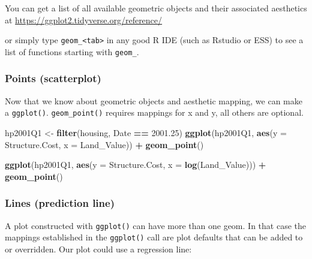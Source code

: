 \documentclass[]{book}
\newenvironment{Shaded}{\begin{snugshade}}{\end{snugshade}}
\newcommand{\KeywordTok}[1]{\textcolor[rgb]{0.13,0.29,0.53}{\textbf{#1}}}
\newcommand{\DataTypeTok}[1]{\textcolor[rgb]{0.13,0.29,0.53}{#1}}
\newcommand{\FloatTok}[1]{\textcolor[rgb]{0.00,0.00,0.81}{#1}}
\newcommand{\StringTok}[1]{\textcolor[rgb]{0.31,0.60,0.02}{#1}}
\newcommand{\OperatorTok}[1]{\textcolor[rgb]{0.81,0.36,0.00}{\textbf{#1}}}
\newcommand{\NormalTok}[1]{#1}
\begin{document}
You can get a list of all available geometric objects and their
associated aesthetics at \url{https://ggplot2.tidyverse.org/reference/}

or simply type \texttt{geom\_\textless{}tab\textgreater{}} in any good R
IDE (such as Rstudio or ESS) to see a list of functions starting with
\texttt{geom\_}.

\subsubsection{Points (scatterplot)}\label{points-scatterplot}

Now that we know about geometric objects and aesthetic mapping, we can
make a \texttt{ggplot()}. \texttt{geom\_point()} requires mappings for x
and y, all others are optional.

\begin{Shaded}
\begin{Highlighting}[]
\NormalTok{hp2001Q1 <-}\StringTok{ }\KeywordTok{filter}\NormalTok{(housing, Date }\OperatorTok{==}\StringTok{ }\FloatTok{2001.25}\NormalTok{) }
\KeywordTok{ggplot}\NormalTok{(hp2001Q1,}
       \KeywordTok{aes}\NormalTok{(}\DataTypeTok{y =}\NormalTok{ Structure.Cost, }\DataTypeTok{x =}\NormalTok{ Land_Value)) }\OperatorTok{+}
\StringTok{  }\KeywordTok{geom_point}\NormalTok{()}
\end{Highlighting}
\end{Shaded}

\begin{Shaded}
\begin{Highlighting}[]
\KeywordTok{ggplot}\NormalTok{(hp2001Q1,}
       \KeywordTok{aes}\NormalTok{(}\DataTypeTok{y =}\NormalTok{ Structure.Cost, }\DataTypeTok{x =} \KeywordTok{log}\NormalTok{(Land_Value))) }\OperatorTok{+}
\StringTok{  }\KeywordTok{geom_point}\NormalTok{()}
\end{Highlighting}
\end{Shaded}

\subsubsection{Lines (prediction line)}\label{lines-prediction-line}

A plot constructed with \texttt{ggplot()} can have more than one geom.
In that case the mappings established in the \texttt{ggplot()} call are
plot defaults that can be added to or overridden. Our plot could use a
regression line:
\end{document}
